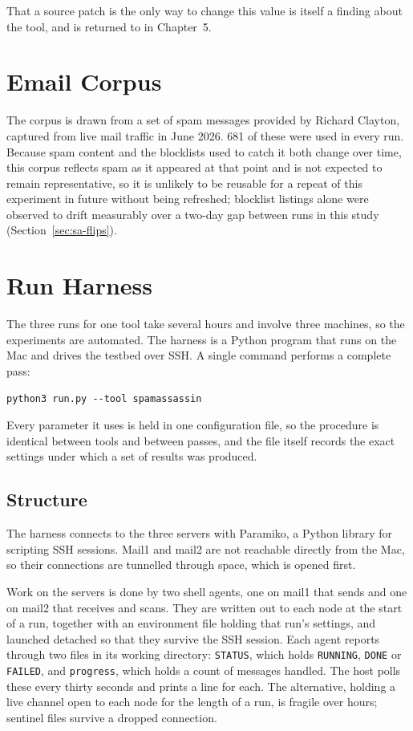 That a source patch is the only way to change this value is itself a finding about
the tool, and is returned to in Chapter~5.

\section{Email Corpus}
The corpus is drawn from a set of spam messages provided by Richard Clayton, captured from live mail traffic in June 2026. 681 of these were used in every run. Because spam content and the blocklists used to catch it both change over time, this corpus reflects spam as it appeared at that point and is not expected to remain representative, so it is unlikely to be reusable for a repeat of this experiment in future without being refreshed; blocklist listings alone were observed to drift measurably over a two-day gap between runs in this study (Section~\ref{sec:sa-flips}).

\section{Run Harness}
\label{sec:harness}

The three runs for one tool take several hours and involve three machines, so the
experiments are automated. The harness is a Python program that runs on the Mac and
drives the testbed over SSH. A single command performs a complete pass:

\begin{lstlisting}
python3 run.py --tool spamassassin
\end{lstlisting}

Every parameter it uses is held in one configuration file, so the procedure is identical between tools and between passes, and the file itself records the exact settings under which a set of results was produced.

\subsection{Structure}

The harness connects to the three servers with Paramiko, a Python library for scripting SSH sessions. Mail1 and mail2 are not reachable directly from the Mac, so their connections are tunnelled through space, which is opened first.

Work on the servers is done by two shell agents, one on mail1 that sends and one on
mail2 that receives and scans. They are written out to each node at the start of a
run, together with an environment file holding that run's settings, and launched
detached so that they survive the SSH session. Each agent reports through two files
in its working directory: \texttt{STATUS}, which holds \texttt{RUNNING},
\texttt{DONE} or \texttt{FAILED}, and \texttt{progress}, which holds a count of
messages handled. The host polls these every thirty seconds and prints a line for
each. The alternative, holding a live channel open to each node for the length of a
run, is fragile over hours; sentinel files survive a dropped connection.

